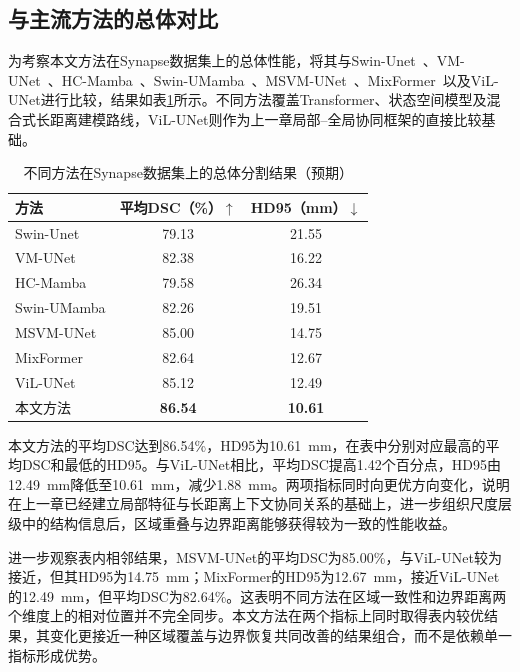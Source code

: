 \subsection{与主流方法的总体对比}

为考察本文方法在Synapse数据集上的总体性能，将其与Swin-Unet~\cite{cao2022swinunet}、VM-UNet~\cite{ruan2024vmunet}、HC-Mamba~\cite{xu2024hcmamba}、Swin-UMamba~\cite{liu2024swinumamba}、MSVM-UNet~\cite{chen2024msvmunet}、MixFormer~\cite{liu2025mixformer}以及ViL-UNet进行比较，结果如表\ref{tab:ch4-overall-comparison}所示。不同方法覆盖Transformer、状态空间模型及混合式长距离建模路线，ViL-UNet则作为上一章局部--全局协同框架的直接比较基础。

\begin{table}[htbp]
  \centering
  \caption{不同方法在Synapse数据集上的总体分割结果（预期）}
  \label{tab:ch4-overall-comparison}
  \begin{tabular}{lcc}
    \toprule
    方法 & 平均DSC（\%）$\uparrow$ & HD95（mm）$\downarrow$ \\
    \midrule
    Swin-Unet   & 79.13 & 21.55 \\
    VM-UNet     & 82.38 & 16.22 \\
    HC-Mamba    & 79.58 & 26.34 \\
    Swin-UMamba & 82.26 & 19.51 \\
    MSVM-UNet   & 85.00 & 14.75 \\
    MixFormer   & 82.64 & 12.67 \\
    ViL-UNet    & 85.12 & 12.49 \\
    本文方法      & \textbf{86.54} & \textbf{10.61} \\
    \bottomrule
  \end{tabular}
\end{table}

本文方法的平均DSC达到86.54\%，HD95为10.61~mm，在表中分别对应最高的平均DSC和最低的HD95。与ViL-UNet相比，平均DSC提高1.42个百分点，HD95由12.49~mm降低至10.61~mm，减少1.88~mm。两项指标同时向更优方向变化，说明在上一章已经建立局部特征与长距离上下文协同关系的基础上，进一步组织尺度层级中的结构信息后，区域重叠与边界距离能够获得较为一致的性能收益。

进一步观察表内相邻结果，MSVM-UNet的平均DSC为85.00\%，与ViL-UNet较为接近，但其HD95为14.75~mm；MixFormer的HD95为12.67~mm，接近ViL-UNet的12.49~mm，但平均DSC为82.64\%。这表明不同方法在区域一致性和边界距离两个维度上的相对位置并不完全同步。本文方法在两个指标上同时取得表内较优结果，其变化更接近一种区域覆盖与边界恢复共同改善的结果组合，而不是依赖单一指标形成优势。

